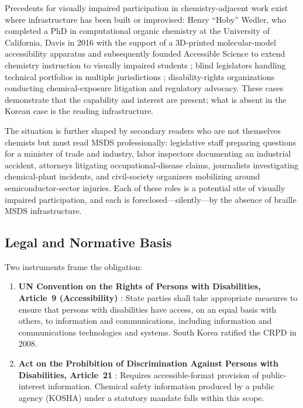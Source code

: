 \documentclass[journal]{IEEEtran}
\begin{document}
Precedents for visually impaired participation in chemistry-adjacent work exist where infrastructure has been built or improvised: Henry ``Hoby'' Wedler, who completed a PhD in computational organic chemistry at the University of California, Davis in 2016 with the support of a 3D-printed molecular-model accessibility apparatus and subsequently founded Accessible Science to extend chemistry instruction to visually impaired students \cite{wedler}; blind legislators handling technical portfolios in multiple jurisdictions \cite{nfb_legislators}; disability-rights organizations conducting chemical-exposure litigation and regulatory advocacy. These cases demonstrate that the capability and interest are present; what is absent in the Korean case is the reading infrastructure.

The situation is further shaped by secondary readers who are not themselves chemists but must read MSDS professionally: legislative staff preparing questions for a minister of trade and industry, labor inspectors documenting an industrial accident, attorneys litigating occupational-disease claims, journalists investigating chemical-plant incidents, and civil-society organizers mobilizing around semiconductor-sector injuries. Each of these roles is a potential site of visually impaired participation, and each is foreclosed---silently---by the absence of braille MSDS infrastructure.

\subsection{Legal and Normative Basis}

Two instruments frame the obligation:

\begin{enumerate}
\item \textbf{UN Convention on the Rights of Persons with Disabilities, Article~9 (Accessibility)} \cite{crpd}: State parties shall take appropriate measures to ensure that persons with disabilities have access, on an equal basis with others, to information and communications, including information and communications technologies and systems. South Korea ratified the CRPD in 2008.

\item \textbf{Act on the Prohibition of Discrimination Against Persons with Disabilities, Article~21} \cite{kdpa}: Requires accessible-format provision of public-interest information. Chemical safety information produced by a public agency (KOSHA) under a statutory mandate falls within this scope.
\end{enumerate}
\end{document}
